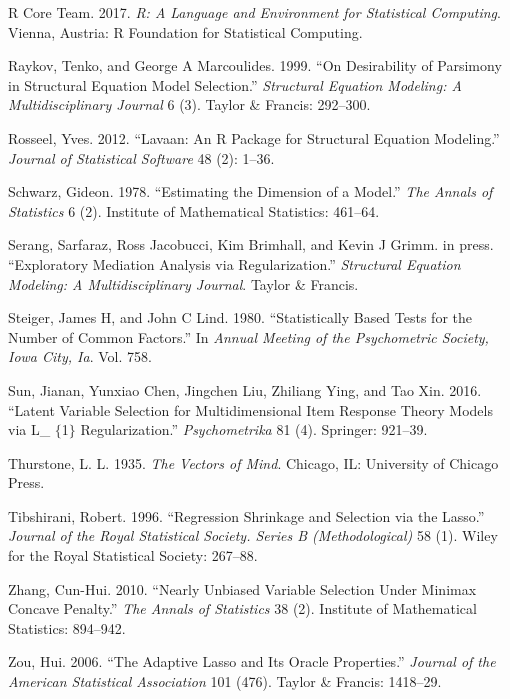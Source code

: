 \hypertarget{ref-statspackage}{}
R Core Team. 2017. \emph{R: A Language and Environment for Statistical
Computing}. Vienna, Austria: R Foundation for Statistical Computing.

\hypertarget{ref-raykov1999desirability}{}
Raykov, Tenko, and George A Marcoulides. 1999. ``On Desirability of
Parsimony in Structural Equation Model Selection.'' \emph{Structural
Equation Modeling: A Multidisciplinary Journal} 6 (3). Taylor \&
Francis: 292--300.

\hypertarget{ref-rosseel2012}{}
Rosseel, Yves. 2012. ``Lavaan: An R Package for Structural Equation
Modeling.'' \emph{Journal of Statistical Software} 48 (2): 1--36.

\hypertarget{ref-schwarz1978estimating}{}
Schwarz, Gideon. 1978. ``Estimating the Dimension of a Model.''
\emph{The Annals of Statistics} 6 (2). Institute of Mathematical
Statistics: 461--64.

\hypertarget{ref-serang2017xmed}{}
Serang, Sarfaraz, Ross Jacobucci, Kim Brimhall, and Kevin J Grimm. in
press. ``Exploratory Mediation Analysis via Regularization.''
\emph{Structural Equation Modeling: A Multidisciplinary Journal}. Taylor
\& Francis.

\hypertarget{ref-steiger1980}{}
Steiger, James H, and John C Lind. 1980. ``Statistically Based Tests for
the Number of Common Factors.'' In \emph{Annual Meeting of the
Psychometric Society, Iowa City, Ia}. Vol. 758.

\hypertarget{ref-sun2016latent}{}
Sun, Jianan, Yunxiao Chen, Jingchen Liu, Zhiliang Ying, and Tao Xin.
2016. ``Latent Variable Selection for Multidimensional Item Response
Theory Models via L\_ \(\{\)1\(\}\) Regularization.''
\emph{Psychometrika} 81 (4). Springer: 921--39.

\hypertarget{ref-thurstone1937}{}
Thurstone, L. L. 1935. \emph{The Vectors of Mind}. Chicago, IL:
University of Chicago Press.

\hypertarget{ref-Tibshirani1996}{}
Tibshirani, Robert. 1996. ``Regression Shrinkage and Selection via the
Lasso.'' \emph{Journal of the Royal Statistical Society. Series B
(Methodological)} 58 (1). Wiley for the Royal Statistical Society:
267--88.

\hypertarget{ref-zhang2010nearly}{}
Zhang, Cun-Hui. 2010. ``Nearly Unbiased Variable Selection Under Minimax
Concave Penalty.'' \emph{The Annals of Statistics} 38 (2). Institute of
Mathematical Statistics: 894--942.

\hypertarget{ref-zou2006adaptive}{}
Zou, Hui. 2006. ``The Adaptive Lasso and Its Oracle Properties.''
\emph{Journal of the American Statistical Association} 101 (476). Taylor
\& Francis: 1418--29.

